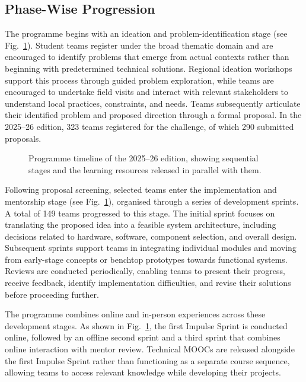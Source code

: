 \documentclass[runningheads]{llncs}
\begin{document}
\subsection{Phase-Wise Progression}

The programme begins with an ideation and problem-identification stage (see Fig.~\ref{fig2}). Student teams register under the broad thematic domain and are encouraged to identify problems that emerge from actual contexts rather than beginning with predetermined technical solutions. Regional ideation workshops support this process through guided problem exploration, while teams are encouraged to undertake field visits and interact with relevant stakeholders to understand local practices, constraints, and needs. Teams subsequently articulate their identified problem and proposed direction through a formal proposal. In the 2025–26 edition, 323 teams registered for the challenge, of which 290 submitted proposals.

\begin{figure}[htbp]
\centering

\caption{Programme timeline of the 2025–26 edition, showing sequential stages and the learning resources released in parallel with them.}
\label{fig2}
\end{figure}

Following proposal screening, selected teams enter the implementation and mentorship stage (see Fig.~\ref{fig2}), organised through a series of development sprints. A total of 149 teams progressed to this stage. The initial sprint focuses on translating the proposed idea into a feasible system architecture, including decisions related to hardware, software, component selection, and overall design. Subsequent sprints support teams in integrating individual modules and moving from early-stage concepts or benchtop prototypes towards functional systems. Reviews are conducted periodically, enabling teams to present their progress, receive feedback, identify implementation difficulties, and revise their solutions before proceeding further.

The programme combines online and in-person experiences across these development stages. As shown in Fig.~\ref{fig2}, the first Impulse Sprint is conducted online, followed by an offline second sprint and a third sprint that combines online interaction with mentor review. Technical MOOCs are released alongside the first Impulse Sprint rather than functioning as a separate course sequence, allowing teams to access relevant knowledge while developing their projects.
\end{document}
